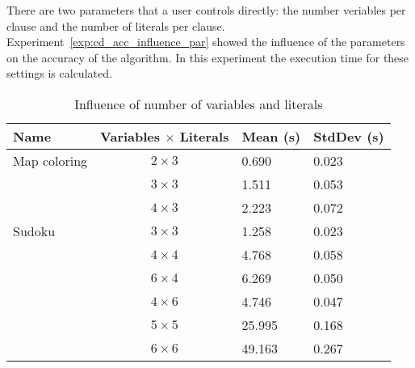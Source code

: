 \begin{experiment}
	There are two parameters that a user controls directly: the number veriables per clause and the number of literals per clause.
	Experiment~\ref{exp:cd_acc_influence_par} showed the influence of the parameters on the accuracy of the algorithm.
	In this experiment the execution time for these settings is calculated.

	\begin{table}[!htp]
		\begin{tabularx}{\textwidth}{lc|XX}
			\textbf{Name}	& \textbf{Variables $\times$ Literals}	& \textbf{Mean (s)}	& \textbf{StdDev (s)} \\
			\toprule
			Map coloring 	& $2 \times 3$ 			& 0.690				& 0.023	\\
							& $3 \times 3$ 			& 1.511				& 0.053	\\
							& $4 \times 3$ 			& 2.223				& 0.072	\\
			\midrule	
			Sudoku 			& $3 \times 3$ 			& 1.258				& 0.023	\\
							& $4 \times 4$ 			& 4.768				& 0.058	\\
							& $6 \times 4$ 			& 6.269				& 0.050	\\
							& $4 \times 6$ 			& 4.746				& 0.047	\\
							& $5 \times 5$ 			& 25.995			& 0.168	\\
							& $6 \times 6$ 			& 49.163			& 0.267
		\end{tabularx}
		\caption{Influence of number of variables and literals}
		\label{tbl:cd_speed_influence}
	\end{table}

\end{experiment}

